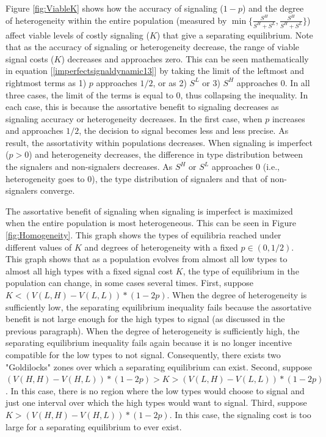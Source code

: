  Figure \ref{fig:ViableK} shows how the accuracy of signaling ($1-p$) and the degree of heterogeneity within the entire population  (measured by $\min\{\frac{S^H}{S^H+S^L}, \frac{S^H}{S^H+S^L}\}$) affect viable levels of costly signaling ($K$) that give a separating equilibrium. Note that as the accuracy of signaling or heterogeneity decrease, the range of viable signal costs ($K$) decreases and approaches zero. This can be seen mathematically in equation [\ref{imperfectsignaldynamic13}] by taking the limit of the leftmost and rightmost terms as 1) $p$ approaches $1/2$, or as 2) $S^L$ or 3) $S^H$ approaches $0$. In all three cases, the limit of the terms is equal to $0$, thus collapsing the inequality. In each case, this is because the assortative benefit to signaling decreases as signaling accuracy or heterogeneity decreases. In the first case, when $p$ increases and approaches $1/2$, the decision to signal becomes less and less precise. As result, the assortativity within populations decreases. When signaling is imperfect ($p>0$) and heterogeneity decreases, the difference in type distribution between the signalers and non-signalers decreases. As $S^H$ or $S^L$ approaches $0$ (i.e., heterogeneity goes to $0$), the type distribution of signalers and that of non-signalers converge.
 
 The assortative benefit of signaling when signaling is imperfect is maximized when the entire population is most heterogeneous. This can be seen in Figure \ref{fig:Homogeneity}. This graph shows the types of equilibria reached under different values of $K$ and degrees of heterogeneity with a fixed $p \in (0,1/2)$. This graph shows that as a population evolves from almost all low types to almost all high types with a fixed signal cost $K$, the type of equilibrium in the population can change, in some cases several times. First, suppose $K < (V(L,H) - V(L,L))*(1-2p)$. When the degree of heterogeneity is sufficiently low, the separating equilibrium inequality fails because the assortative benefit is not large enough for the high types to signal (as discussed in the previous paragraph). When the degree of heterogeneity is sufficiently high, the separating equilibrium inequality fails again  because it is no longer incentive compatible for the low types to not signal. Consequently, there exists two "Goldilocks" zones over which a separating equilibrium can exist. Second, suppose $(V(H,H) - V(H,L))*(1-2p) > K > (V(L,H) - V(L,L))*(1-2p)$. In this case,  there is no region where the low types would choose to signal and just one interval over which the high types would want to signal. Third, suppose $K > (V(H,H) - V(H,L))*(1-2p)$. In this case, the signaling cost is too large for a separating equilibrium to ever exist. 
 
